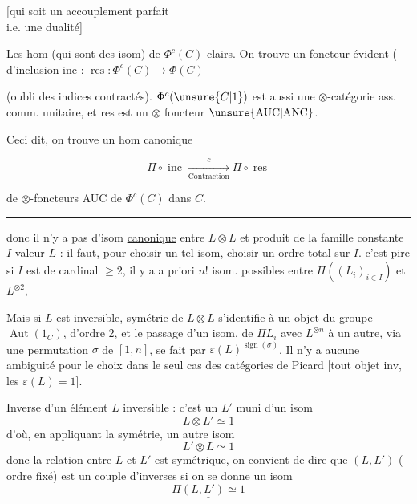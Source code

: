 [qui soit un accouplement parfait\\ i.e. une dualité]

 Les hom (qui sont des isom) de $\Phi^c(C)$ clairs. On trouve un foncteur évident  ( d'inclusion inc : $\operatorname{res}:\Phi^c(C)\longrightarrow\Phi(C)$

(oubli des indices contractés). $\Phi^c(\unsure{C|1})$ est aussi une $\otimes$-catégorie ass. comm.  unitaire, et res est un $\otimes$ foncteur $\unsure{\mathrm{AUC}|\mathrm{ANC}}$.

Ceci dit, on trouve un hom canonique

\[\Pi\circ\operatorname{inc}\xrightarrow[\text{Contraction}]{c}\Pi\circ\operatorname{res}\]

de $\otimes$-foncteurs AUC de $\Phi^c(C)$ dans $C$.

\noindent\hfil\rule{2.7em}{.4pt}\hfil


donc il n'y a pas d'isom \uline{canonique} entre $L\otimes L$ et  produit de la famille constante  $I$  valeur $L$ : il faut, pour choisir un tel isom, choisir un ordre total sur $I$. c'est pire si $I$ est de cardinal $\geq2$, il y a  a priori $n!$ isom. possibles entre $\Pi((L_i)_{i\in I})$ et $L^{\otimes 2}$,

Mais si $L$ est inversible,  symétrie de $L\otimes L$  s'identifie à un objet  du groupe $\operatorname{Aut}(1_C)$, d'ordre 2, et le passage d'un isom. de $\Pi L_i$ avec $L^{\otimes n}$ à un autre, via une permutation $\sigma$ de $[1,n]$, se fait par $\varepsilon(L)^{\operatorname{sign}(\sigma)}$. Il n'y a aucune ambiguité pour le choix dans le seul cas des catégories de Picard [tout objet inv, les $\varepsilon(L)=1$].


Inverse d'un élément $L$ inversible : c'est un $L'$ muni d'un isom
\[L\otimes L'\simeq1\]
d'où, en appliquant la symétrie, un  autre isom
\[L'\otimes L\simeq1\]
donc la relation entre $L$ et $L'$ est symétrique, on convient de dire que $(L,L')$ ( ordre fixé) est un couple d'inverses si on se donne un isom
\[\underline{\Pi(L,L')\simeq1}\]

